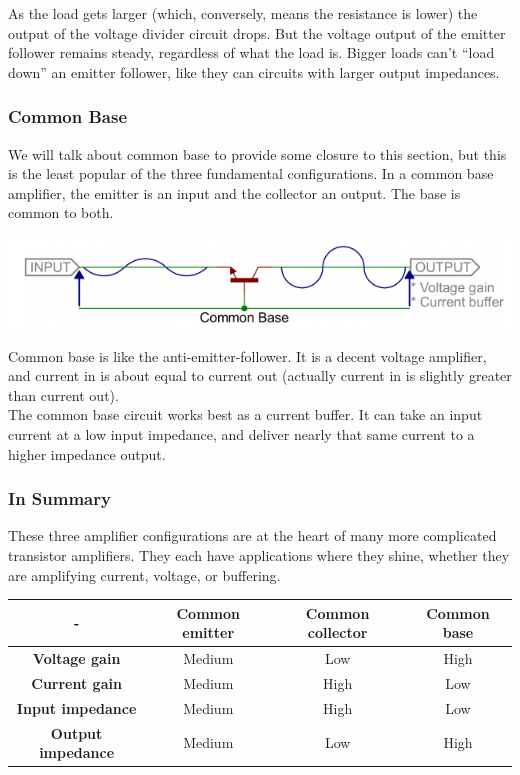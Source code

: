 \documentclass[a4paper, 11pt]{article} %
\begin{document}
As the load gets larger (which, conversely, means the resistance is lower) the output of the voltage divider circuit drops. But the voltage output of the emitter follower remains steady, regardless of what the load is. Bigger loads can’t “load down” an emitter follower, like they can circuits with larger output impedances.

\subsubsection*{Common Base}

We will talk about common base to provide some closure to this section, but this is the least popular of the three fundamental configurations. In a common base amplifier, the emitter is an input and the collector an output. The base is common to both.

\begin{center}
\includegraphics[width=400pt]{tran26}
\end{center}

Common base is like the anti-emitter-follower. It is a decent voltage amplifier, and current in is about equal to current out (actually current in is slightly greater than current out).\\

The common base circuit works best as a current buffer. It can take an input current at a low input impedance, and deliver nearly that same current to a higher impedance output.

\subsubsection*{In Summary}

These three amplifier configurations are at the heart of many more complicated transistor amplifiers. They each have applications where they shine, whether they are amplifying current, voltage, or buffering.

\begin{center}
\begin{tabular}{|c|c|c|c|}
\hline 
- & \textbf{Common emitter} & \textbf{Common collector} & \textbf{Common base} \\ 
\hline 
\textbf{Voltage gain} & Medium & Low & High \\ 
\hline 
\textbf{Current gain} & Medium & High & Low \\ 
\hline 
\textbf{Input impedance} & Medium & High & Low \\ 
\hline 
\textbf{Output impedance} & Medium & Low & High \\ 
\hline 
\end{tabular} 
\end{center}
\end{document}
